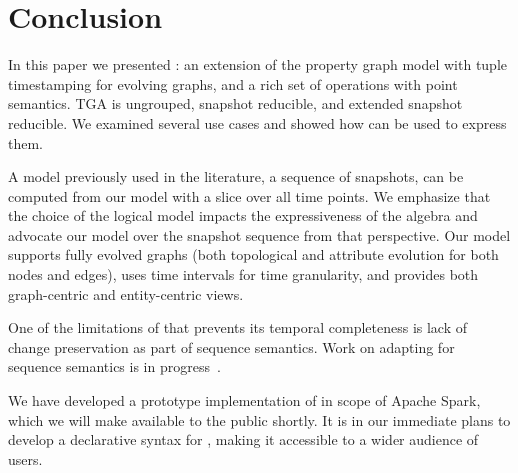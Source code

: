 \section{Conclusion}
\label{sec:conc}

In this paper we presented \tga: an extension of the property graph
model with tuple timestamping for evolving graphs, and a rich set of
operations with point semantics.  TGA is ungrouped, snapshot
reducible, and extended snapshot reducible.  We examined several use
cases and showed how \tga can be used to express them.

A model previously used in the literature, a sequence of snapshots,
can be computed from our model with a slice over all time points.  We
emphasize that the choice of the logical model impacts the
expressiveness of the algebra and advocate our model over the snapshot
sequence from that perspective.  Our model supports fully evolved
graphs (both topological and attribute evolution for both nodes and
edges), uses time intervals for time granularity, and provides both
graph-centric and entity-centric views.

One of the limitations of \tga that prevents its temporal completeness
is lack of change preservation as part of sequence semantics.  Work on
adapting \tga for sequence semantics is in
progress~\cite{MoffittEDBT17}.

We have developed a prototype implementation of \tga in scope of
Apache Spark, which we will make available to the public shortly.  It
is in our immediate plans to develop a declarative syntax for \tga,
making it accessible to a wider audience of users.
